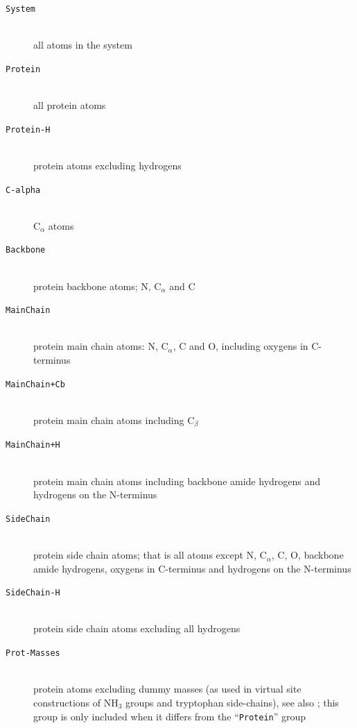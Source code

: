 \begin{description}
\item[{\tt System}]\mbox{}\\
        all atoms in the system
\item[{\tt Protein}]\mbox{}\\
        all protein atoms
\item[{\tt Protein-H}]\mbox{}\\
        protein atoms excluding hydrogens
\item[{\tt C-alpha}]\mbox{}\\
        C$_{\alpha}$ atoms
\item[{\tt Backbone}]\mbox{}\\
        protein backbone atoms; N, C$_{\alpha}$ and C
\item[{\tt MainChain}]\mbox{}\\
        protein main chain atoms: N, C$_{\alpha}$, C and O, including
        oxygens in C-terminus
\item[{\tt MainChain+Cb}]\mbox{}\\
        protein main chain atoms including C$_{\beta}$
\item[{\tt MainChain+H}]\mbox{}\\
        protein main chain atoms including backbone amide hydrogens and
        hydrogens on the N-terminus
\item[{\tt SideChain}]\mbox{}\\
        protein side chain atoms; that is all atoms except N,
        C$_{\alpha}$, C, O, backbone amide hydrogens, oxygens in
        C-terminus and hydrogens on the N-terminus
\item[{\tt SideChain-H}]\mbox{}\\
        protein side chain atoms excluding all hydrogens

\item[{\tt Prot-Masses}]\mbox{}\\
        protein atoms excluding dummy masses (as used in virtual site
        constructions of NH$_3$ groups and tryptophan side-chains),
        see also ; this group is only included when
        it differs from the ``{\tt Protein}'' group


\end{description}
